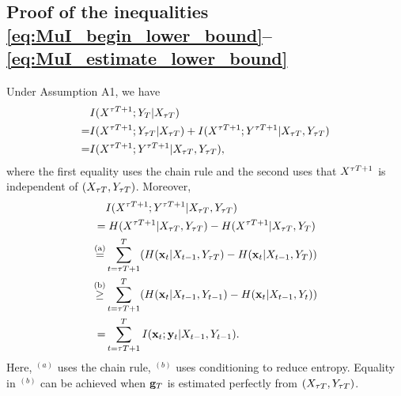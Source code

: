 \documentclass[12pt, draftclsnofoot,journal,onecolumn]{IEEEtran}
\begin{document}
\subsection{Proof of the inequalities \eqref{eq:MuI_begin_lower_bound}--\eqref{eq:MuI_estimate_lower_bound}}
Under Assumption A1, we have
\begin{align*}
    &I(X^{{\tau T}+1};Y_{T}|X_{\tau T})\\
    =&I(X^{{\tau T}+1};Y_{{\tau T}}|X_{\tau T})+I(X^{{\tau T}+1};Y^{{\tau T}+1}|X_{\tau T},Y_{{\tau T}})\\
    =&I(X^{{\tau T}+1};Y^{{\tau T}+1}|X_{\tau T},Y_{{\tau T}}),
\end{align*}
where the first equality uses the chain rule and the second uses that $X^{{\tau T}+1}$ is independent of $(X_{\tau T},Y_{\tau T})$. 
Moreover, 
\begin{align*}
    &I(X^{{\tau T}+1};Y^{{\tau T}+1}|X_{{\tau T}},Y_{{\tau T}})\\
    \stackrel{}{=}&\;H(X^{{\tau T}+1}|X_{{\tau T}},Y_{{\tau T}}) - H(X^{{\tau T}+1}|X_{{\tau T}},Y_{T})\\
    \stackrel{\rm{( a)}}{=}&\sum_{t={{\tau T}+1}}^{T}(H({\mathbf{x}}_t|X_{t-1},Y_{{\tau T}}) - H({\mathbf{x}}_t|X_{t-1},Y_{T}))\\
    \stackrel{\rm{( b)}}{\geq}&\sum_{t={{\tau T}+1}}^{T}(H({\mathbf{x}}_t|X_{t-1},Y_{t-1}) - H({\mathbf{x}}_t|X_{t-1},Y_{t}))\\
    =& \sum_{t={\tau T}+1}^{T}I({\mathbf{x}}_t;{\mathbf{y}}_t|X_{t-1},Y_{t-1}).
\end{align*}
Here, $^{(a)}$ uses the chain rule, $^{(b)}$ uses conditioning to reduce entropy. Equality in $^{(b)}$ can be achieved when ${\mathbf{g}}_{T}$ is estimated perfectly from $(X_{{\tau T}},Y_{{\tau T}})$. 
\end{document}
